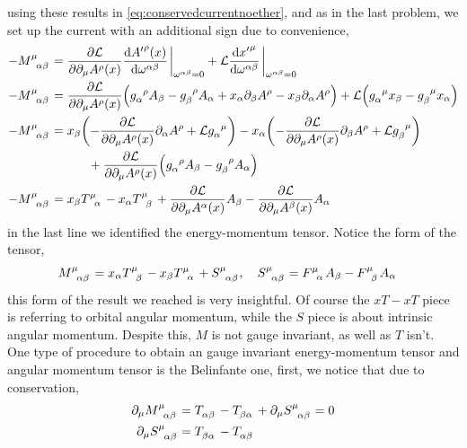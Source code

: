 using these results in \cref{eq:conservedcurrentnoether}, and as in the last problem, we set up the current with an additional sign due to 
convenience,
\begin{align}
    -\tensor{M}{^\mu_\alpha_\beta} &=\pdv{\mathcal L}{\partial_\mu A^\rho\qty(x)}\dv{{A'}^\rho\qty(x)}{\omega^{\alpha\beta}}\eval_{\omega^{\alpha\beta}=0}+\mathcal L\dv{{x'}^\mu}{\omega^{\alpha\beta}}\eval_{\omega^{\alpha\beta}=0}\\
    -\tensor{M}{^\mu_\alpha_\beta} &=\pdv{\mathcal L}{\partial_\mu A^\rho\qty(x)}\qty(\tensor{g}{_\alpha^\rho}A_\beta-\tensor{g}{_\beta^\rho}A_\alpha+x_\alpha\partial_\beta A^\rho-x_\beta\partial_\alpha A^\rho)+\mathcal L\qty(\tensor{g}{_\alpha^\mu}x_\beta-\tensor{g}{_\beta^\mu}x_\alpha)\\
    -\tensor{M}{^\mu_\alpha_\beta} &=x_\beta\qty(-\pdv{\mathcal L}{\partial_\mu A^\rho\qty(x)}\partial_\alpha A^\rho+\mathcal L\tensor{g}{_\alpha^\mu})-x_\alpha\qty(-\pdv{\mathcal L}{\partial_\mu A^\rho\qty(x)}\partial_\beta A^\rho+\mathcal L\tensor{g}{_\beta^\mu})\nonumber\\
    &\quad\quad\quad+\pdv{\mathcal L}{\partial_\mu A^\rho\qty(x)}\qty(\tensor{g}{_\alpha^\rho}A_\beta-\tensor{g}{_\beta^\rho}A_\alpha)\\
    -\tensor{M}{^\mu_\alpha_\beta} &=x_\beta \tensor{T}{^\mu_\alpha}-x_\alpha \tensor{T}{^\mu_\beta}+\pdv{\mathcal L}{\partial_\mu A^\alpha\qty(x)}A_\beta-\pdv{\mathcal L}{\partial_\mu A^\beta\qty(x)}A_\alpha
\end{align}
in the last line we identified the energy-momentum tensor. Notice the form of the tensor,
\begin{align}
    \tensor{M}{^\mu_\alpha_\beta}&=x_\alpha \tensor{T}{^\mu_\beta}-x_\beta \tensor{T}{^\mu_\alpha}+\tensor{S}{^\mu_\alpha_\beta},\ \ \ \tensor{S}{^\mu_\alpha_\beta}= \tensor{F}{^\mu_\alpha}A_\beta-\tensor{F}{^\mu_\beta}A_\alpha
\end{align}
this form of the result we reached is very insightful. Of course the $xT-xT$ piece is referring to orbital angular momentum, 
while the $S$ piece is about intrinsic angular momentum. Despite this, $M$ is not gauge invariant, as well as $T$ isn't. One type of 
procedure to obtain an gauge invariant energy-momentum tensor and angular momentum tensor is the Belinfante one, first, we notice that 
due to conservation,
\begin{align}
    \partial_\mu\tensor{M}{^\mu_\alpha_\beta}&=\tensor{T}{_\alpha_\beta}-\tensor{T}{_\beta_\alpha}+\partial_\mu \tensor{S}{^\mu_\alpha_\beta}=0\\
    \partial_\mu \tensor{S}{^\mu_\alpha_\beta}&=\tensor{T}{_\beta_\alpha}-\tensor{T}{_\alpha_\beta}
\end{align}
